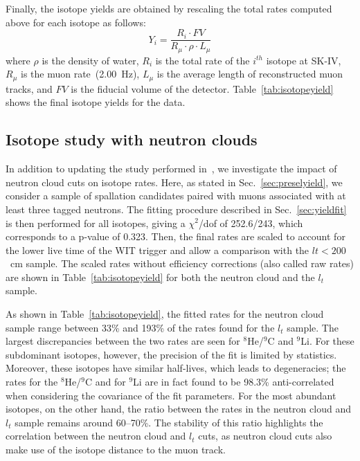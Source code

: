 Finally, the isotope yields are obtained by rescaling the total rates computed above for each isotope as follows:
\begin{equation}
    Y_i = \frac{R_i\cdot FV}{R_\mu\cdot\rho\cdot L_\mu}
\end{equation}
where $\rho$ is the density of water, $R_i$ is the total rate of the $i^{th}$ isotope at SK-IV, $R_\mu$ is the muon rate~(2.00~Hz), $L_\mu$ is the average length of reconstructed muon tracks, and $FV$ is the fiducial volume of the detector. Table~\ref{tab:isotopeyield} shows the final isotope yields for the data.


\subsection{Isotope study with neutron clouds}
\label{sec:neuteff}
In addition to updating the study performed in~\cite{SKspall_zhang}, we investigate the impact of neutron cloud cuts on isotope rates. Here, as stated in Sec.~\ref{sec:preselyield}, we consider a sample of spallation candidates paired with muons associated with at least three tagged neutrons. The fitting procedure described in Sec.~\ref{sec:yieldfit} is then performed for all isotopes, giving a $\chi^2$/dof of 252.6/243, which corresponds to a p-value of 0.323. Then, the final rates are scaled to account for the lower live time of the WIT trigger and allow a comparison with the $lt< 200$~cm sample. The scaled rates without efficiency corrections (also called raw rates) are shown in Table~\ref{tab:isotopeyield} for both the neutron cloud and the $l_t$ sample.

As shown in Table~\ref{tab:isotopeyield}, the fitted rates for the neutron cloud sample range between 33\% and 193\% of the rates found for the $l_t$ sample. The largest discrepancies between the two rates are seen for $^8$He/$^9$C and $^9$Li. For these subdominant isotopes, however, the precision of the fit is limited by statistics. Moreover, these isotopes have similar half-lives, which leads to degeneracies; the rates for the $^8$He/$^9$C and for $^9$Li are in fact found to be 98.3\% anti-correlated when considering the covariance of the fit parameters. For the most abundant isotopes, on the other hand, the ratio between the rates in the neutron cloud and $l_t$ sample remains around 60--70\%. The stability of this ratio highlights the correlation between the neutron cloud and $l_t$ cuts, as neutron cloud cuts also make use of the isotope distance to the muon track. 




